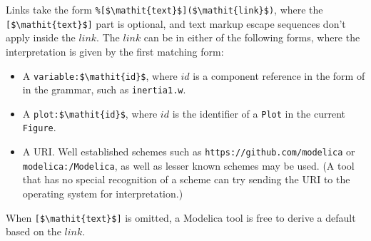 Links take the form \lstinline!%[$\mathit{text}$]($\mathit{link}$)!, where the \lstinline![$\mathit{text}$]! part is optional, and text markup escape sequences don't apply inside the $\mathit{link}$.
The $\mathit{link}$ can be in either of the following forms, where the interpretation is given by the first matching form:
\begin{itemize}
\item
A \lstinline!variable:$\mathit{id}$!, where $\mathit{id}$ is a component reference in the form of  in the grammar, such as \lstinline!inertia1.w!.
\item
A \lstinline!plot:$\mathit{id}$!, where $\mathit{id}$ is the identifier of a \lstinline!Plot! in the current \lstinline!Figure!.
\item
A URI.
Well established schemes such as \lstinline[language={[nocomment]modelica}]!https://github.com/modelica! or \lstinline[language={[nocomment]modelica}]!modelica:/Modelica!, as well as lesser known schemes may be used.
(A tool that has no special recognition of a scheme can try sending the URI to the operating system for interpretation.)
\end{itemize}

When \lstinline![$\mathit{text}$]! is omitted, a Modelica tool is free to derive a default based on the $\mathit{link}$.

